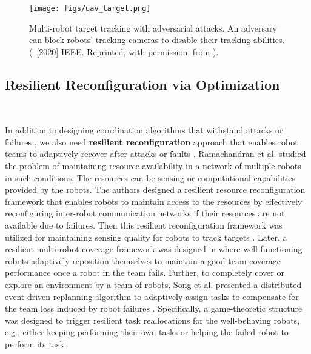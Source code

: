 \begin{figure}
\centering
 \texttt{[image: figs/uav\_target.png]}
\caption{Multi-robot target tracking with adversarial attacks. An adversary can block robots' tracking cameras to disable their tracking abilities. (\textcopyright~[2020] IEEE. Reprinted, with permission, from  \cite{zhou2019distributed}).
}
\label{fig:multi-track}       %
\end{figure}


\subsection{Resilient Reconfiguration via Optimization}~\label{subsec:resilient_configuration}

In addition to designing coordination algorithms that withstand attacks or failures \cite{zhou2018resilient,zhou2019distributed,shi2020robust,tzoumas2017resilient}, we also need \textbf{resilient reconfiguration} approach that enables robot teams to adaptively recover after attacks or faults \cite{ramachandran2019resilience,song2020care,ramachandran2020ICRA,ramachandran2020}. Ramachandran et al. studied the problem of maintaining resource availability in a network of multiple robots \cite{ramachandran2019resilience} in such conditions. The resources can be sensing or computational capabilities provided by the robots. The authors designed a resilient resource reconfiguration framework that enables robots to maintain access to the resources by effectively reconfiguring inter-robot communication networks if their resources are not available due to failures. Then this resilient reconfiguration framework was utilized for maintaining sensing quality for robots to track targets \cite{ramachandran2020ICRA}. Later, a resilient multi-robot coverage framework was designed in \cite{ramachandran2020} where well-functioning robots adaptively reposition themselves to maintain a good team coverage performance once a robot in the team fails. Further, to completely cover or explore an environment by a team of robots, Song et al. presented a distributed event-driven replanning algorithm to adaptively assign tasks to compensate for the team loss induced by robot failures \cite{song2012simultaneous}. Specifically, a game-theoretic structure was designed to trigger resilient task reallocations for the well-behaving robots, e.g., either keeping performing their own tasks or helping the failed robot to perform its task.  

